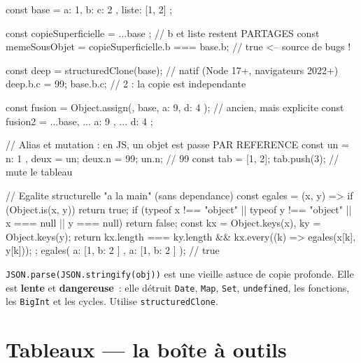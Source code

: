 \documentclass[12pt,a4paper,twoside,openright]{book}
\begin{document}
\begin{codejs}
const base = { a: 1, b: { c: 2 }, liste: [1, 2] };

const copieSuperficielle = { ...base };            // b et liste restent PARTAGES
const memeSousObjet = copieSuperficielle.b === base.b;   // true  <-- source de bugs !

const deep = structuredClone(base);                // natif (Node 17+, navigateurs 2022+)
deep.b.c = 99; base.b.c;                            // 2 : la copie est independante

const fusion = Object.assign({}, base, { a: 9, d: 4 });  // ancien, mais explicite
const fusion2 = { ...base, ...{ a: 9 }, ...{ d: 4 } };

// Alias et mutation : en JS, un objet est passe PAR REFERENCE
const un = { n: 1 }, deux = un; deux.n = 99; un.n;   // 99
const tab = [1, 2]; tab.push(3);                       // mute le tableau

// Egalite structurelle "a la main" (sans dependance)
const egales = (x, y) => {
  if (Object.is(x, y)) return true;
  if (typeof x !== "object" || typeof y !== "object" || x === null || y === null) return false;
  const kx = Object.keys(x), ky = Object.keys(y);
  return kx.length === ky.length && kx.every((k) => egales(x[k], y[k]));
};
egales({ a: [1, { b: 2 }] }, { a: [1, { b: 2 }] });   // true
\end{codejs}

\begin{piege}
\verb|JSON.parse(JSON.stringify(obj))| est une vieille astuce de copie profonde. Elle est
\textbf{lente} et \textbf{dangereuse}~: elle d\'etruit \verb|Date|, \verb|Map|, \verb|Set|,
\verb|undefined|, les fonctions, les \verb|BigInt| et les cycles. Utilise \verb|structuredClone|.
\end{piege}

\section{Tableaux --- la bo\^ite \`a outils}
\end{document}
